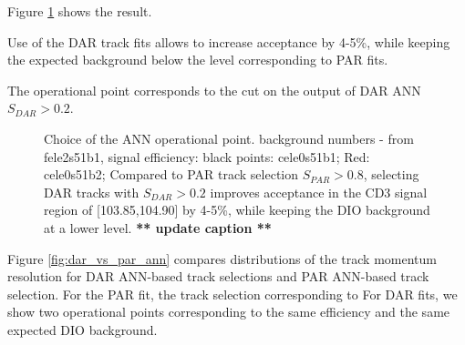 Figure \ref{fig:ann_operational_point_choice} shows the result.

Use of the DAR track fits allows to increase acceptance by 4-5\%, while keeping the expected
background below the level corresponding to PAR fits.

The operational point corresponds to the cut on the output of DAR ANN $S_{DAR} > 0.2$.

\begin{figure}
\caption{
  \label{fig:ann_operational_point_choice}
  Choice of the ANN operational point. background numbers - from fele2s51b1,
  signal efficiency: black points: cele0s51b1; Red: cele0s51b2;
  Compared to PAR track selection $S_{PAR} > 0.8$, selecting DAR tracks with $S_{DAR} > 0.2$ 
  improves acceptance in the CD3 signal region of [103.85,104.90] by 4-5\%, 
  while keeping the DIO background at a lower level.
  {\color{red} {\bf *** update caption **}}
}
\end{figure}

Figure \ref{fig:dar_vs_par_ann} compares distributions of the track momentum resolution for DAR ANN-based track
selections and PAR ANN-based track selection. For the PAR fit, the track selection corresponding to For DAR fits, 
we show two operational points corresponding to the same efficiency and the same expected DIO background.

